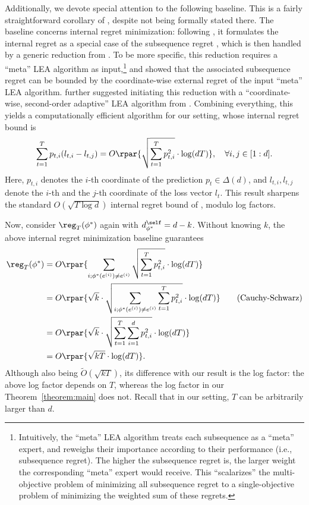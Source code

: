 \documentclass[10pt]{article}
\begin{document}
Additionally, we devote special attention to the following baseline. This is a fairly straightforward corollary of \citep[Section~3.3]{roth2023learning}, despite not being formally stated there. The baseline concerns internal regret minimization: following \citep[Definition~32]{roth2023learning}, it formulates the internal regret as a special case of the subsequence regret \citep[Definition~28 and 29]{roth2023learning}, which is then handled by a generic reduction from \citep[Theorem~14]{roth2023learning}. To be more specific, this reduction requires a ``meta'' LEA algorithm as input,\footnote{Intuitively, the ``meta'' LEA algorithm treats each subsequence as a ``meta'' expert, and reweighs their importance according to their performance (i.e., subsequence regret). The higher the subsequence regret is, the larger weight the corresponding ``meta'' expert would receive. This ``scalarizes'' the multi-objective problem of minimizing all subsequence regret to a single-objective problem of minimizing the weighted sum of these regrets.} and \citep[Theorem~14]{roth2023learning} showed that the associated subsequence regret can be bounded by the coordinate-wise external regret of the input ``meta'' LEA algorithm. \cite{noarov2023high} further suggested initiating this reduction with a ``coordinate-wise, second-order adaptive'' LEA algorithm from \citep{chen2021impossible}. Combining everything, this yields a computationally efficient algorithm for our setting, whose internal regret bound is
\begin{equation*}
\sum_{t=1}^Tp_{t,i}(l_{t,i}-l_{t,j})=O\rpar{\sqrt{\sum_{t=1}^Tp^2_{t,i}}\cdot \log (dT)},\quad\forall i,j\in[1:d].
\end{equation*}
Here, $p_{t,i}$ denotes the $i$-th coordinate of the prediction $p_t\in\Delta(d)$, and $l_{t,i},l_{t,j}$ denote the $i$-th and the $j$-th coordinate of the loss vector $l_t$. This result sharpens the standard $O(\sqrt{T\log d})$ internal regret bound of \citep[Chapter~4.4]{cesa2006prediction}, modulo log factors. 

Now, consider $\reg_T(\phi^*)$ again with $d^\self_{\phi^*}=d-k$. Without knowing $k$, the above internal regret minimization baseline guarantees
\begin{align*}
\reg_T(\phi^*)&=O\rpar{\sum_{i;\phi^*(e^{(i)})\neq e^{(i)}}\sqrt{\sum_{t=1}^Tp^2_{t,i}}\cdot \log (dT)}\\
&=O\rpar{\sqrt{k}\cdot \sqrt{\sum_{i;\phi^*(e^{(i)})\neq e^{(i)}}\sum_{t=1}^Tp^2_{t,i}}\cdot \log (dT)}\tag{Cauchy-Schwarz}\\
&=O\rpar{\sqrt{k}\cdot \sqrt{\sum_{t=1}^T\sum_{i=1}^d p^2_{t,i}}\cdot \log (dT)}\\
&=O\rpar{\sqrt{kT}\cdot \log (dT)}.
\end{align*}
Although also being $\tilde O(\sqrt{kT})$, its difference with our result is the log factor: the above log factor depends on $T$, whereas the log factor in our Theorem~\ref{theorem:main} does not. Recall that in our setting, $T$ can be arbitrarily larger than $d$. 
\end{document}

